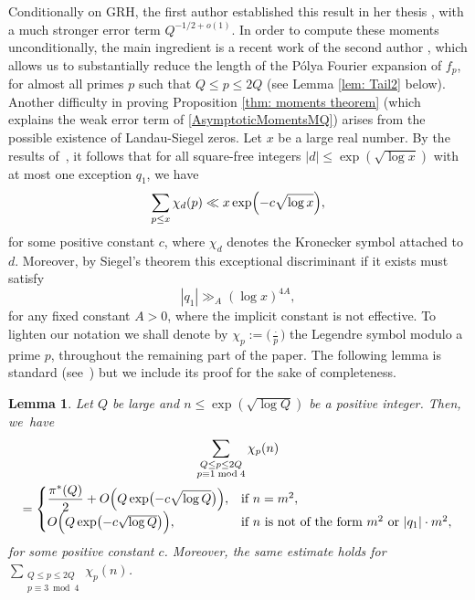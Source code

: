 \documentclass[JEP,XML,SOM,Unicode,NoFloatCountersInSection,published]{cedram}
\theoremstyle{plain}
\newtheorem{lem}[thm]{Lemma}
\theoremstyle{definition}
\newcommand{\legendre}[2]{\bigl(\tfrac{#1}{#2}\bigr)}
\begin{document}
Conditionally on GRH, the first author established this result in her thesis \cite{Hu}, with a much stronger error term $Q^{-1/2+o(1)}$. In order to compute these moments unconditionally, the main ingredient is a recent work of the second author \cite{La}, which allows us to substantially reduce the length of the Pólya Fourier expansion of $f_p$, for almost all primes $p$ such that $Q\leq p\leq 2Q$ (see Lemma \ref{lem: Tail2} below).
Another difficulty in proving Proposition \ref{thm: moments theorem} (which explains the weak error term of \eqref{AsymptoticMomentsMQ}) arises from the possible existence of Landau-Siegel zeros. Let $x$ be a large real number. By the results of~\hbox{\cite[Chap.\,20]{Da}}, it follows that for all square-free integers $|d|\leq \exp(\sqrt{\log x})$ with at most one exception $q_1$, we have
\begin{equation}\label{NoExceptional}
\sum_{p\leq x} \chi_d(p) \ll x\exp\Bigl(-c\sqrt{\log x}\Bigr),
\end{equation}
for some positive constant $c$, where $\chi_d$ denotes the Kronecker symbol attached to $d$.
Moreover, by Siegel's theorem this exceptional discriminant if it exists must satisfy
\begin{equation}\label{LowerBoundSiegel}
|q_1|\gg_A (\log x)^{4A},
\end{equation}
for any fixed constant $A>0$, where the implicit constant is not effective.
To lighten our notation we shall denote by $\chi_p:=\legendre{\cdot}{p}$ the Legendre symbol modulo a prime $p$, throughout the remaining part of the paper.
The following lemma is standard (see~\cite{Da}) but we include its proof for the sake of completeness.
\begin{lem}\label{Siegel}
Let $Q$ be large and $n\leq \exp\left(\sqrt{\log Q}\right)$ be a positive integer. Then, we~have
\begin{multline*}
\sum_{\substack{Q\leq p\leq 2Q\\ p\equiv 1 \bmod 4}} \chi_{p}(n)\\
=\begin{cases} \displaystyle{\frac{\pi^*(Q)}{2}}+O\Bigl(Q\exp\bigl(-c\sqrt{\log Q}\bigr)\Bigr), & \textup{if } n= m^2,\\
O\Bigl(Q\exp\bigl(-c\sqrt{\log Q}\bigr)\Bigr), & \textup{if } n \text{ is not of the form } m^2 \text{ or } |q_1| \cdot m^2,\end{cases}
\end{multline*}
for some positive constant $c$.
Moreover, the same estimate holds for $ \sum_{\substack{Q\leq p\leq 2Q\\ p\equiv 3 \bmod 4}} \chi_{p}(n)$.
\end{lem}
\end{document}
